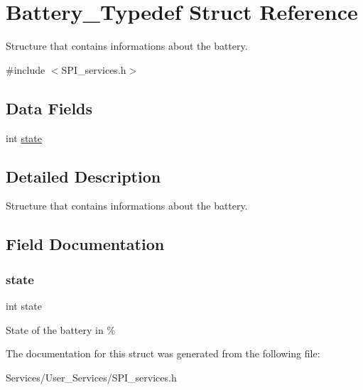 \hypertarget{struct_battery___typedef}{}\section{Battery\+\_\+\+Typedef Struct Reference}
\label{struct_battery___typedef}


Structure that contains informations about the battery.  




{\ttfamily \#include $<$S\+P\+I\+\_\+services.\+h$>$}

\subsection*{Data Fields}
\begin{DoxyCompactItemize}
\item 
int \hyperlink{struct_battery___typedef_a89f234133d3efe315836311cbf21c64b}{state}
\end{DoxyCompactItemize}


\subsection{Detailed Description}
Structure that contains informations about the battery. 

\subsection{Field Documentation}
\mbox{\label{struct_battery___typedef_a89f234133d3efe315836311cbf21c64b}} 
\subsubsection{\texorpdfstring{state}{state}}
{\footnotesize\ttfamily int state}

State of the battery in \% 

The documentation for this struct was generated from the following file\+:\begin{DoxyCompactItemize}
\item 
Services/\+User\+\_\+\+Services/S\+P\+I\+\_\+services.\+h\end{DoxyCompactItemize}
